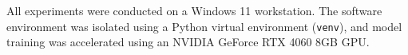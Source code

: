 All experiments were conducted on a Windows 11 workstation. The software environment was isolated using a Python virtual environment (\texttt{venv}), and model training was accelerated using an NVIDIA GeForce RTX 4060 8GB GPU.






